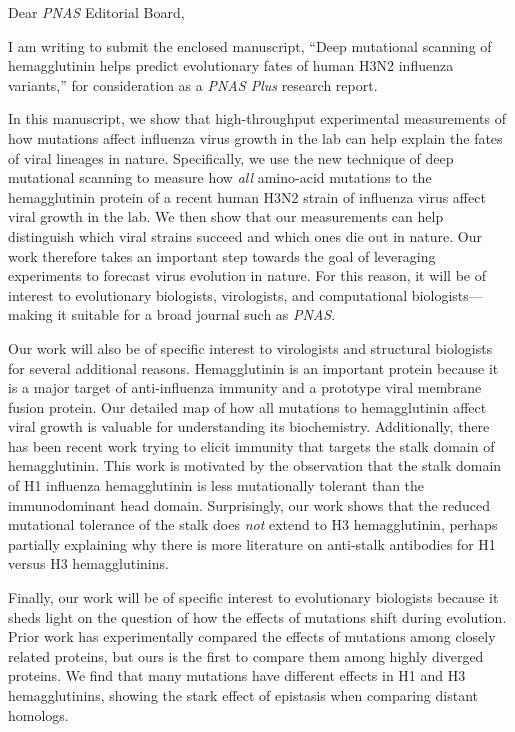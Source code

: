 \documentclass[a4paper,11pt]{letter}
\begin{document}
\begin{letter}{}

\opening{Dear \textit{PNAS} Editorial Board,} %

I am writing to submit the enclosed manuscript, ``Deep mutational scanning of hemagglutinin helps predict evolutionary fates of human H3N2 influenza variants,'' for consideration as a \textit{PNAS Plus} research report.

In this manuscript, we show that high-throughput experimental measurements of how mutations affect influenza virus growth in the lab can help explain the fates of viral lineages in nature.
Specifically, we use the new technique of deep mutational scanning to measure how \emph{all} amino-acid mutations to the hemagglutinin protein of a recent human H3N2 strain of influenza virus affect viral growth in the lab.
We then show that our measurements can help distinguish which viral strains succeed and which ones die out in nature.
Our work therefore takes an important step towards the goal of leveraging experiments to forecast virus evolution in nature.
For this reason, it will be of interest to evolutionary biologists, virologists, and computational biologists---making it suitable for a broad journal such as \textit{PNAS}.

Our work will also be of specific interest to virologists and structural biologists for several additional reasons.
Hemagglutinin is an important protein because it is a major target of anti-influenza immunity and a prototype viral membrane fusion protein.
Our detailed map of how all mutations to hemagglutinin affect viral growth is valuable for understanding its biochemistry.
Additionally, there has been recent work trying to elicit immunity that targets the stalk domain of hemagglutinin.
This work is motivated by the observation that the stalk domain of H1 influenza hemagglutinin is less mutationally tolerant than the immunodominant head domain.
Surprisingly, our work shows that the reduced mutational tolerance of the stalk does \emph{not} extend to H3 hemagglutinin, perhaps partially explaining why there is more literature on anti-stalk antibodies for H1 versus H3 hemagglutinins.

Finally, our work will be of specific interest to evolutionary biologists because it sheds light on the question of how the effects of mutations shift during evolution.
Prior work has experimentally compared the effects of mutations among closely related proteins, but ours is the first to compare them among highly diverged proteins.
We find that many mutations have different effects in H1 and H3 hemagglutinins, showing the stark effect of epistasis when comparing distant homologs.


\end{letter}
\end{document}
